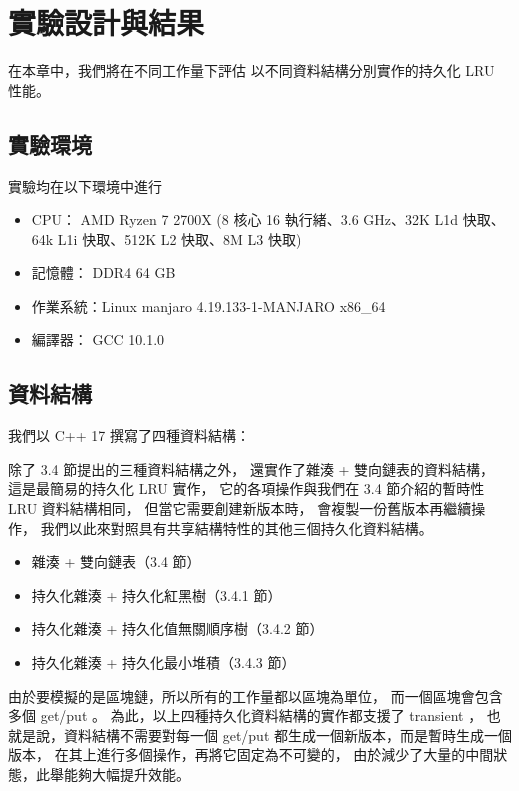 \chapter{實驗設計與結果}
\label{c:experiment}

在本章中，我們將在不同工作量下評估
以不同資料結構分別實作的持久化 LRU 性能。

\section{實驗環境}
實驗均在以下環境中進行

\begin{itemize}
\item CPU： AMD Ryzen 7 2700X (8 核心 16 執行緒、3.6 GHz、32K L1d 快取、64k L1i 快取、512K L2 快取、8M L3 快取)
\item 記憶體： DDR4 64 GB
\item 作業系統：Linux manjaro 4.19.133-1-MANJARO x86\_64
\item 編譯器： GCC 10.1.0
\end{itemize}

\section{資料結構}

我們以 C++ 17 撰寫了四種資料結構：

除了 3.4 節提出的三種資料結構之外，
還實作了雜湊 + 雙向鏈表的資料結構，
這是最簡易的持久化 LRU 實作，
它的各項操作與我們在 3.4 節介紹的暫時性 LRU 資料結構相同，
但當它需要創建新版本時，
會複製一份舊版本再繼續操作，
我們以此來對照具有共享結構特性的其他三個持久化資料結構。

\begin{itemize}
\item 雜湊 + 雙向鏈表（3.4 節）
\item 持久化雜湊 + 持久化紅黑樹（3.4.1 節）
\item 持久化雜湊 + 持久化值無關順序樹（3.4.2 節）
\item 持久化雜湊 + 持久化最小堆積（3.4.3 節）
\end{itemize}

由於要模擬的是區塊鏈，所以所有的工作量都以區塊為單位，
而一個區塊會包含多個 get/put 。
為此，以上四種持久化資料結構的實作都支援了 transient \cite{puente2017persistence}，
也就是說，資料結構不需要對每一個 get/put 都生成一個新版本，而是暫時生成一個版本，
在其上進行多個操作，再將它固定為不可變的，
由於減少了大量的中間狀態，此舉能夠大幅提升效能。

